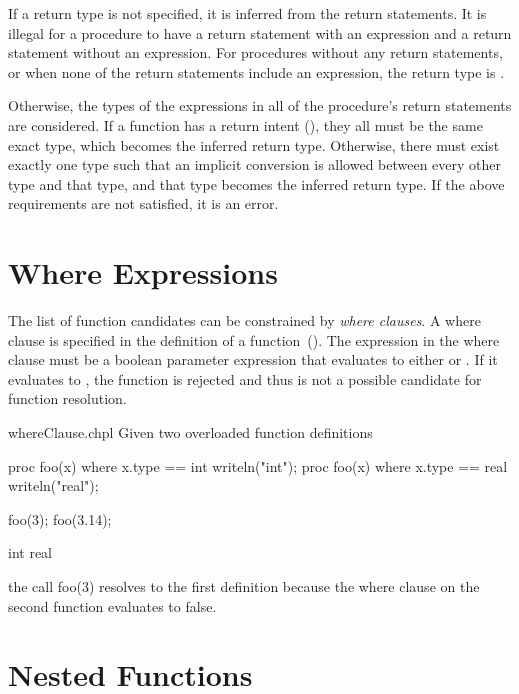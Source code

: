 If a return type is not specified, it is inferred from the return statements.
It is illegal for a procedure to have a return statement with an expression
and a return statement without an expression.
For procedures without any return statements, or when none of the
return statements include an expression, the return type is .

Otherwise, the types of the expressions in all of the procedure's
return statements are considered.
If a function has a  return intent (), they
all must be the same exact type, which becomes the inferred return type.
Otherwise, there must exist exactly one type such that an implicit conversion
is allowed between every other type and that type, and that type becomes the
inferred return type.
If the above requirements are not satisfied, it is an error.

\section{Where Expressions}
\label{Where_Expressions}

The list of function candidates can be constrained by {\em where clauses}.  A
where clause is specified in the definition of a
function~().  The expression in the where clause
must be a boolean parameter expression that evaluates to either  or
. If it evaluates to , the function is rejected and
thus is not a possible candidate for function resolution.

\begin{chapelexample}{whereClause.chpl}
Given two overloaded function definitions
\begin{chapel}
proc foo(x) where x.type == int { writeln("int"); }
proc foo(x) where x.type == real { writeln("real"); }
\end{chapel}
\begin{chapelpost}
foo(3);
foo(3.14);
\end{chapelpost}
\begin{chapeloutput}
int
real
\end{chapeloutput}
the call foo(3) resolves to the first definition because the where clause on
the second function evaluates to false.
\end{chapelexample}

\section{Nested Functions}
\label{Nested_Functions}

